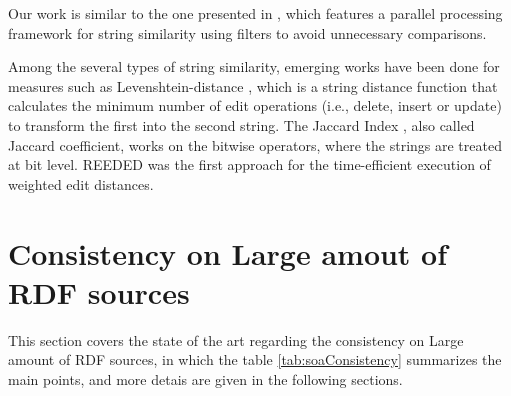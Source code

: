 Our work is similar to the one presented in \cite{10.1371/journal.pone.0172526}, which features a parallel processing framework for string similarity using filters to avoid unnecessary comparisons. 

Among the several types of string similarity, emerging works have been done for measures such as Levenshtein-distance \cite{levenshtein1966binary}, which is a string distance function that calculates the minimum number of edit operations (i.e., delete, insert or update) to transform the first into the second string. 
The Jaccard Index \cite{jaccard1912distribution}, also called Jaccard coefficient, works on the bitwise operators, where the strings are treated at bit level. 
REEDED \cite{soru2013rapid} was the first approach for the time-efficient execution of weighted edit distances. 

\section{Consistency on Large amout of RDF sources}
This section covers the state of the art regarding the consistency on Large amount of RDF sources, in which the table \ref{tab:soaConsistency} summarizes the main points, and more detais are given in the following sections.

